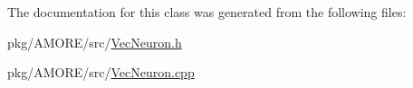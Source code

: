 The documentation for this class was generated from the following files:\begin{DoxyCompactItemize}
\item 
pkg/AMORE/src/\hyperlink{_vec_neuron_8h}{VecNeuron.h}\item 
pkg/AMORE/src/\hyperlink{_vec_neuron_8cpp}{VecNeuron.cpp}\end{DoxyCompactItemize}
